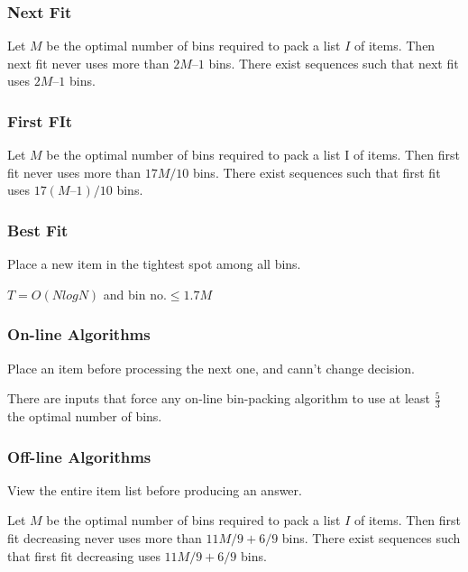 \subsubsection{Next Fit}
\begin{theorem}
    Let $M$ be the optimal number of bins required to pack a list $I$ of items.  Then next fit never uses more than $2M – 1$ bins.  There exist sequences such that next fit uses $2M  – 1$ bins.
\end{theorem}

\subsubsection{First FIt}
\begin{theorem}
    Let $M$ be the optimal number of bins required to pack a list I of items.  Then first fit never uses more than $17M / 10$ bins. There exist sequences such that first fit uses $17(M – 1) / 10$ bins.
\end{theorem}

\subsubsection{Best Fit}
Place a new item in the tightest spot among all bins.

$T = O( N log N )$ and bin no.$\le  1.7M$  


\subsubsection{On-line Algorithms}
Place an item before processing the next one, and cann't change decision.

\begin{theorem}
    There are inputs that force any on-line bin-packing algorithm to use at least $\frac{5}{3}$ the optimal number of bins.
\end{theorem}

\subsubsection{Off-line Algorithms}
View the entire item list before producing an answer.

\begin{theorem}
    Let $M$ be the optimal number of bins required to pack a list $I$ of items.  Then first fit decreasing never uses more than $11M / 9 + 6/9$ bins.  There exist sequences such that first fit decreasing uses $11M / 9 + 6/9$ bins.
\end{theorem}

